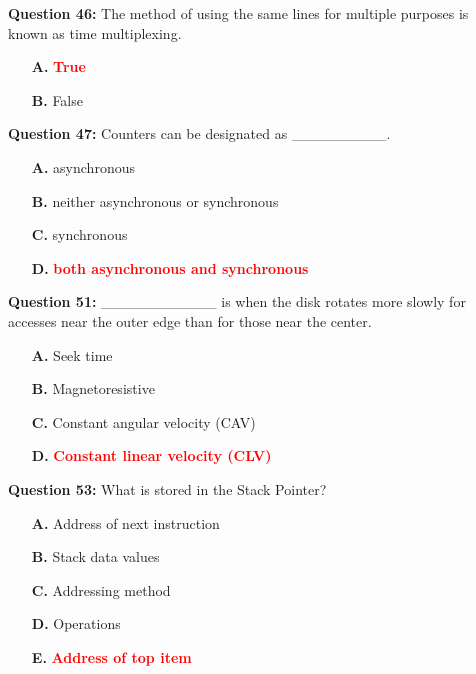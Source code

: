 \documentclass[12pt,a4paper]{article}
\begin{document}
\textbf{Question 46:} The method of using the same lines for multiple purposes is known as time multiplexing.

\begin{itemize}
    \item[\textbf{A.}] \textcolor{red}{\textbf{True}}
    \item[\textbf{B.}] False
\end{itemize}

\vspace{0.5cm}

\textbf{Question 47:} Counters can be designated as _________.

\begin{itemize}
    \item[\textbf{A.}] asynchronous
    \item[\textbf{B.}] neither asynchronous or synchronous
    \item[\textbf{C.}] synchronous
    \item[\textbf{D.}] \textcolor{red}{\textbf{both asynchronous and synchronous}}
\end{itemize}

\vspace{0.5cm}

\textbf{Question 51:} ___________ is when the disk rotates more slowly for accesses near the outer edge than for those near the center.

\begin{itemize}
    \item[\textbf{A.}] Seek time
    \item[\textbf{B.}] Magnetoresistive
    \item[\textbf{C.}] Constant angular velocity (CAV)
    \item[\textbf{D.}] \textcolor{red}{\textbf{Constant linear velocity (CLV)}}
\end{itemize}

\vspace{0.5cm}

\textbf{Question 53:} What is stored in the Stack Pointer?

\begin{itemize}
    \item[\textbf{A.}] Address of next instruction
    \item[\textbf{B.}] Stack data values
    \item[\textbf{C.}] Addressing method
    \item[\textbf{D.}] Operations
    \item[\textbf{E.}] \textcolor{red}{\textbf{Address of top item}}
\end{itemize}
\end{document}
